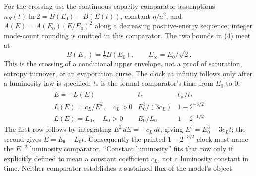 \documentclass[11pt]{article}
\begin{document}
For the crossing use the continuous-capacity comparator assumptions
$n_R(t)\ln2=B(E_0)-B(E(t))$, constant $\eta/a^2$, and
$A(E)=A(E_0)(E/E_0)^2$ along a decreasing positive-energy sequence;
integer mode-count rounding is omitted in this comparator.
The two bounds in (4) meet at
\[
 B(E_\times)=\tfrac12B(E_0),\qquad E_\times=E_0/\sqrt2. \tag{5}
\]
This is the crossing of a conditional upper envelope, not a proof of
saturation, entropy turnover, or an evaporation curve. The clock at
infinity follows only after a luminosity law is specified; $t_*$ is
the formal comparator's time from $E_0$ to $0$:
\[
\begin{array}{c|c|c}
 \dot E=-L(E)&t_*&t_\times/t_*\\ \hline
 L(E)=c_L/E^2,\quad c_L>0
 &E_0^3/(3c_L)&1-2^{-3/2}\\
 L(E)=L_0,\quad L_0>0
 &E_0/L_0&1-2^{-1/2}
\end{array} \tag{6}
\]
The first row follows by integrating $E^2\,dE=-c_L\,dt$, giving
$E^3=E_0^3-3c_Lt$; the second gives $E=E_0-L_0t$.
Consequently the printed $1-2^{-3/2}$ clock must name the $E^{-2}$
luminosity comparator. ``Constant luminosity'' fits that row only if
explicitly defined to mean a constant coefficient $c_L$, not a
luminosity constant in time. Neither comparator establishes a sustained
flux of the model's object.
\end{document}
